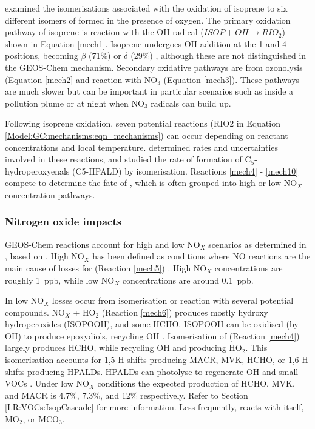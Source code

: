       \textcite{Crounse2011} examined the isomerisations associated with the oxidation of isoprene to six different isomers of \roo formed in the presence of oxygen.
      The primary oxidation pathway of isoprene is reaction with the OH radical ($ ISOP + OH \to RIO_2 $) shown in Equation \ref{mech1}.
      Isoprene undergoes OH addition at the 1 and 4 positions, becoming $\beta$ (71\%) or $\delta$ (29\%) \roo, although these are not distinguished in the GEOS-Chem mechanism. 
      Secondary oxidative pathways are from ozonolysis (Equation \ref{mech2} and reaction with NO$_3$ (Equation \ref{mech3}).
      These pathways are much slower but can be important in particular scenarios such as inside a pollution plume or at night when NO$_3$ radicals can build up.
    
      Following isoprene oxidation, seven potential \roo reactions (RIO2 in Equation \ref{Model:GC:mechanisms:eqn_mechanisms}) can occur depending on reactant concentrations and local temperature.
      \textcite{Crounse2011} determined rates and uncertainties involved in these reactions, and studied the rate of formation of C$_5$-hydroperoxyenals (C5-HPALD) by isomerisation.
      Reactions \ref{mech4} - \ref{mech10} compete to determine the fate of \roo, which is often grouped into high or low NO$_X$ concentration pathways.
      
    
    \subsubsection{Nitrogen oxide impacts}
    
      GEOS-Chem reactions account for high and low NO$_X$ scenarios as determined in \textcite{Mao2013}, based on \textcite{Paulot2009a}.
      High NO$_X$ has been defined as conditions where NO reactions are the main cause of losses for \roo (Reaction \ref{mech5}) \parencite{Palmer2003}.
      High NO$_X$ concentrations are roughly 1~ppb, while low NO$_X$ concentrations are around 0.1~ppb.
      
      In low NO$_X$ \roo losses occur from isomerisation or reaction with several potential compounds.
      NO$_X$ + HO$_2$ (Reaction \ref{mech6}) produces mostly hydroxy hydroperoxides (ISOPOOH), and some HCHO.
      ISOPOOH can be oxidised (by OH) to produce epoxydiols, recycling OH \parencite{Paulot2009b}. 
      Isomerisation of \roo (Reaction \ref{mech4}) largely produces HCHO, while recycling OH and producing HO$_2$.
      This isomerisation accounts for 1,5-H shifts producing MACR, MVK, HCHO, or 1,6-H shifts producing HPALDs.
      HPALDs can photolyse to regenerate OH and small VOCs \parencite{Crounse2011,Wolfe2012, Peeters2014}.
      Under low NO$_X$ conditions the expected production of HCHO, MVK, and MACR is 4.7\%, 7.3\%, and 12\% respectively.
      Refer to Section \ref{LR:VOCs:IsopCascade} for more information.
      Less frequently, \roo reacts with itself, MO$_2$, or MCO$_3$.
      
